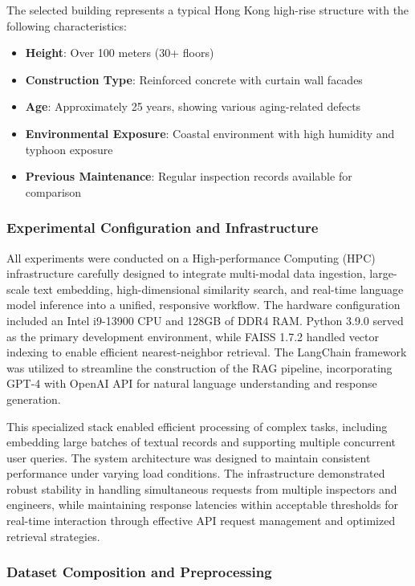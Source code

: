 The selected building represents a typical Hong Kong high-rise structure with the following characteristics:

\begin{itemize}
    \item \textbf{Height}: Over 100 meters (30+ floors)
    \item \textbf{Construction Type}: Reinforced concrete with curtain wall facades
    \item \textbf{Age}: Approximately 25 years, showing various aging-related defects
    \item \textbf{Environmental Exposure}: Coastal environment with high humidity and typhoon exposure
    \item \textbf{Previous Maintenance}: Regular inspection records available for comparison
\end{itemize}

\subsubsection{Experimental Configuration and Infrastructure}

All experiments were conducted on a High-performance Computing (HPC) infrastructure carefully designed to integrate multi-modal data ingestion, large-scale text embedding, high-dimensional similarity search, and real-time language model inference into a unified, responsive workflow. The hardware configuration included an Intel i9-13900 CPU and 128GB of DDR4 RAM. Python 3.9.0 served as the primary development environment, while FAISS 1.7.2 handled vector indexing to enable efficient nearest-neighbor retrieval. The LangChain framework was utilized to streamline the construction of the RAG pipeline, incorporating GPT-4 with OpenAI API for natural language understanding and response generation.

This specialized stack enabled efficient processing of complex tasks, including embedding large batches of textual records and supporting multiple concurrent user queries. The system architecture was designed to maintain consistent performance under varying load conditions. The infrastructure demonstrated robust stability in handling simultaneous requests from multiple inspectors and engineers, while maintaining response latencies within acceptable thresholds for real-time interaction through effective API request management and optimized retrieval strategies.

\subsubsection{Dataset Composition and Preprocessing}

